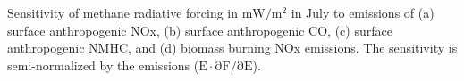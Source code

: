 Sensitivity of methane radiative forcing in $\mathrm{mW/m^2}$ in July to emissions of (a) surface anthropogenic NOx, (b) surface anthropogenic CO, (c) surface anthropogenic NMHC, and (d) biomass burning NOx emissions. The sensitivity is semi-normalized by the emissions ($\mathrm{E \cdot \partial F/\partial E}$). \label{fig:rfsens}